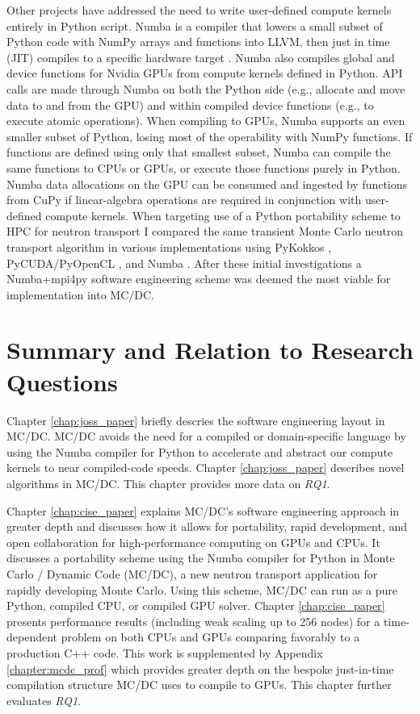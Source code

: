 Other projects have addressed the need to write user-defined compute kernels entirely in Python script.
Numba is a compiler that lowers a small subset of Python code with NumPy arrays and functions into LLVM, then just in time (JIT) compiles to a specific hardware target \cite{lam_numba_2015}. 
Numba also compiles global and device functions for Nvidia GPUs from compute kernels defined in Python.
API calls are made through Numba on both the Python side (e.g., allocate and move data to and from the GPU) and within compiled device functions (e.g., to execute atomic operations).
When compiling to GPUs, Numba supports an even smaller subset of Python, losing most of the operability with NumPy functions.
If functions are defined using only that smallest subset, Numba can compile the same functions to CPUs or GPUs, or execute those functions purely in Python.
Numba data allocations on the GPU can be consumed and ingested by functions from CuPy if linear-algebra operations are required in conjunction with user-defined compute kernels.
When targeting use of a Python portability scheme to HPC for neutron transport I compared the same transient Monte Carlo neutron transport algorithm in various implementations \cite{morgan2022} using PyKokkos \cite{AlAwarETAL21PyKokkos}, PyCUDA/PyOpenCL \cite{kloeckner_pycuda_2012}, and Numba \cite{lam_numba_2015}.
After these initial investigations a Numba+mpi4py software engineering scheme was deemed the most viable for implementation into MC/DC.

\section{Summary and Relation to Research Questions}


Chapter \ref{chap:joss_paper} briefly descries the software engineering layout in MC/DC. MC/DC avoids the need for a compiled or domain-specific language by using the Numba compiler for Python to accelerate and abstract our compute kernels to near compiled-code speeds.
Chapter \ref{chap:joss_paper} describes novel algorithms in MC/DC.
This chapter provides more data on \emph{RQ1}.

Chapter \ref{chap:cise_paper} explains MC/DC's software engineering approach in greater depth and discusses how it allows for portability, rapid development, and open collaboration for high-performance computing on GPUs and CPUs. 
It discusses a portability scheme using the Numba compiler for Python in Monte Carlo / Dynamic Code (MC/DC), a new neutron transport application for rapidly developing Monte Carlo. 
Using this scheme, MC/DC can run as a pure Python, compiled CPU, or compiled GPU solver. 
Chapter \ref{chap:cise_paper} presents performance results (including weak scaling up to 256 nodes) for a time-dependent problem on both CPUs and GPUs comparing favorably to a production C++ code.
This work is supplemented by Appendix \ref{chapter:mcdc_prof} which provides greater depth on the bespoke just-in-time compilation structure MC/DC uses to compile to GPUs.
This chapter further evaluates \emph{RQ1}.

